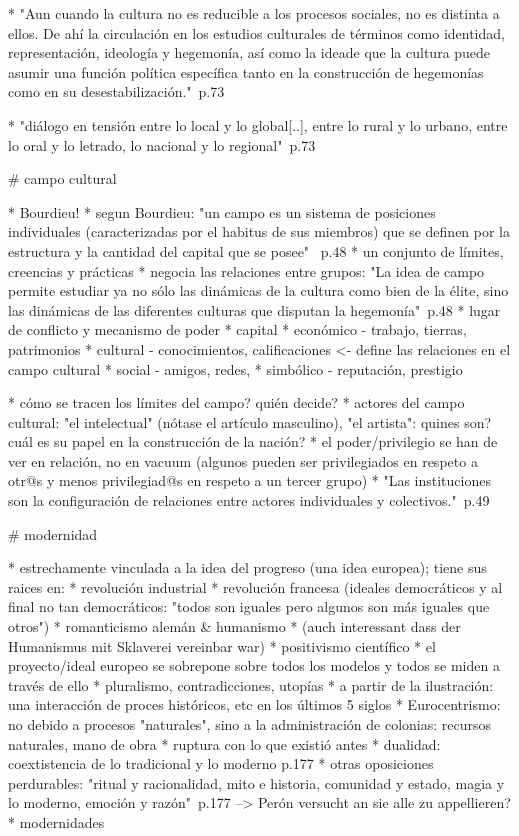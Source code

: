 * "Aun cuando la cultura no es reducible a los procesos sociales, no es distinta a ellos. De ahí la circulación en los estudios culturales de términos como identidad, representación, ideología y hegemonía, así como la ideade que la cultura puede asumir una función política específica tanto en la construcción de hegemonías como en su desestabilización."~\cite{SzIr2009}{p.73}

* "diálogo en tensión entre lo local y lo global[..], entre lo rural y lo urbano, entre lo oral y lo letrado, lo nacional y lo regional"~\cite{SzIr2009}{p.73}

# campo cultural

* Bourdieu!
* segun Bourdieu: "un campo es un sistema de posiciones individuales (caracterizadas por el habitus de sus miembros) que se definen por la estructura y la cantidad del capital que se posee" ~\cite{SzIr2009}{p.48}
* un conjunto de límites, creencias y prácticas
* negocia las relaciones entre grupos: "La idea de campo permite estudiar ya no sólo las dinámicas de la cultura como bien de la élite, sino las dinámicas de las diferentes culturas que disputan la hegemonía"~\cite{SzIr2009}{p.48}
* lugar de conflicto y mecanismo de poder
* capital
  * económico - trabajo, tierras, patrimonios
  * cultural - conocimientos, calificaciones <- define las relaciones en el campo cultural
  * social - amigos, redes,
  * simbólico - reputación, prestigio

* cómo se tracen los límites del campo? quién decide?
* actores del campo cultural: "el intelectual" (nótase el artículo masculino), "el artista": quines son? cuál es su papel en la construcción de la nación?
* el poder/privilegio se han de ver en relación, no en vacuum (algunos pueden ser privilegiados en respeto a otr@s y menos privilegiad@s en respeto a un tercer grupo)
* "Las instituciones son la configuración de relaciones entre actores individuales y colectivos."~\cite{SzIr2009}{p.49}

# modernidad

* estrechamente vinculada a la idea del progreso (una idea europea); tiene sus raices en:
  * revolución industrial
  * revolución francesa (ideales democráticos y al final no tan democráticos: "todos son iguales pero algunos son más iguales que otros")
  * romanticismo alemán & humanismo
    * (auch interessant dass der Humanismus mit Sklaverei vereinbar war)
  * positivismo científico
* el proyecto/ideal europeo se sobrepone sobre todos los modelos y todos se miden a través de ello
* pluralismo, contradicciones, utopías
* a partir de la ilustración: una interacción de proces históricos, etc en los últimos 5 siglos
* Eurocentrismo: no debido a procesos "naturales", sino a la administración de colonias: recursos naturales, mano de obra
* ruptura con lo que existió antes
* dualidad: coextistencia de lo tradicional y lo moderno \cite{SzIr2009}{p.177}
* otras oposiciones perdurables: "ritual y racionalidad, mito e historia, comunidad y estado, magia y lo moderno, emoción y razón"~\cite{SzIr2009}{p.177} --> Perón versucht an sie alle zu appellieren?
* modernidades

